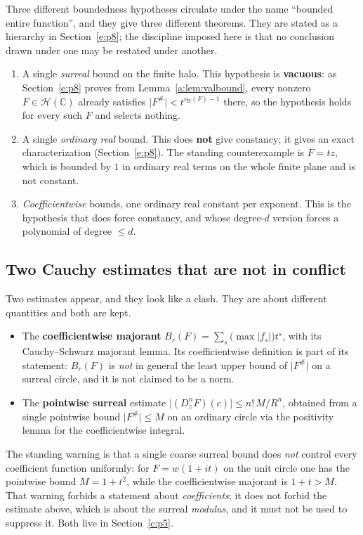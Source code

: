 \documentclass[11pt,a4paper]{article}
\numberwithin{equation}{section}
\theoremstyle{definition}
\theoremstyle{remark}
\theoremstyle{plain}
\newcommand{\CC}{\mathbb C}
\newcommand{\tm}{t}
\newcommand{\ev}[1]{#1^{\#}}
\newcommand{\Hc}{\mathcal H}
\newcommand{\vH}{v_{\mathrm H}}
\newcommand{\abs}[1]{\lvert #1\rvert}
\begin{document}
Three different boundedness hypotheses circulate under the name
``bounded entire function'', and they give three different theorems.
They are stated as a hierarchy in Section~\ref{e:p8}; the discipline imposed here is
that no conclusion drawn under one may be restated under another.
\begin{enumerate}[label=\textup{(L\arabic*)},leftmargin=2.8em]
\item A single \emph{surreal} bound on the finite halo.  This hypothesis
is \textbf{vacuous}: as Section~\ref{e:p8} proves from
Lemma~\ref{a:lem:valbound}, every nonzero $F\in\Hc(\CC)$ already
satisfies $\abs{\ev F}<\tm^{\vH(F)-1}$ there, so the hypothesis holds
for every such $F$ and selects nothing.
\item A single \emph{ordinary real} bound.  This does \textbf{not} give
constancy; it gives an exact characterization (Section~\ref{e:p8}).  The standing
counterexample is $F=\tm z$, which is bounded by $1$ in ordinary real
terms on the whole finite plane and is not constant.
\item \emph{Coefficientwise} bounds, one ordinary real constant per
exponent.  This is the hypothesis that does force constancy, and whose
degree-$d$ version forces a polynomial of degree $\le d$.
\end{enumerate}

\subsection{Two Cauchy estimates that are not in conflict}\label{a:rem:cauchytwo}

Two estimates appear, and they look like a clash.  They are about
different quantities and both are kept.
\begin{itemize}[leftmargin=1.4em]
\item The \textbf{coefficientwise majorant}
$B_r(F)=\sum_s\bigl(\max\abs{f_s}\bigr)\tm^{s}$, with its Cauchy--Schwarz
majorant lemma.  Its coefficientwise definition is part of its
statement: $B_r(F)$ is \emph{not} in general the least upper bound of
$\abs{\ev F}$ on a surreal circle, and it is not claimed to be a norm.
\item The \textbf{pointwise surreal} estimate
$\abs{(D_z^{n}F)(c)}\le n!\,M/R^{n}$, obtained from a single pointwise
bound $\abs{\ev F}\le M$ on an ordinary circle via the positivity lemma
for the coefficientwise integral.
\end{itemize}
The standing warning is that a single coarse surreal bound does
\emph{not} control every coefficient function uniformly: for
$F=w(1+i\tm)$ on the unit circle one has the pointwise bound
$M=1+\tm^{2}$, while the coefficientwise majorant is $1+\tm>M$.  That
warning forbids a statement about \emph{coefficients}; it does not
forbid the estimate above, which is about the surreal \emph{modulus},
and it must not be used to suppress it.  Both live in Section~\ref{c:p5}.
\end{document}
